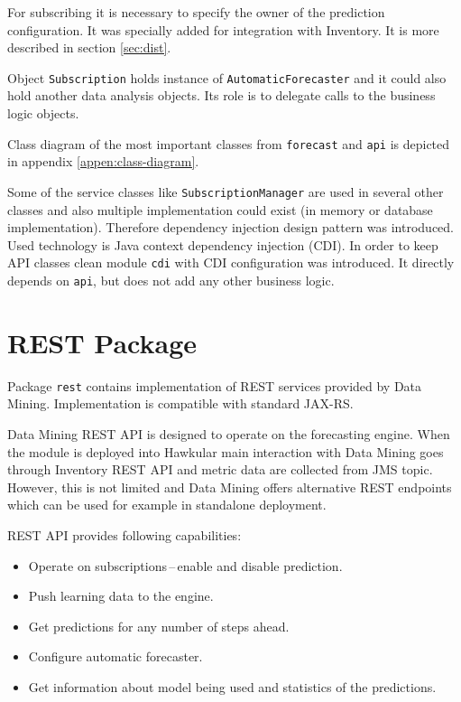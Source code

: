     For subscribing it is necessary to specify the owner of the prediction configuration. It was specially added for
    integration with Inventory. It is more described in section \ref{sec:dist}.

    Object \texttt{Subscription} holds instance of \texttt{AutomaticForecaster} and it could also hold another
    data analysis objects. Its role is to delegate calls to the business logic objects.

    Class diagram of the most important classes from \texttt{forecast} and \texttt{api} is depicted in appendix
    \ref{appen:class-diagram}.

    Some of the service classes like \texttt{SubscriptionManager} are used in several other classes and also multiple
    implementation could exist (in memory or database implementation). Therefore dependency injection
    design pattern was introduced. Used technology is Java context dependency injection (CDI). In order to keep
    API classes clean module \texttt{cdi} with CDI configuration was introduced. It directly depends on \texttt{api},
    but does not add any other business logic.

    \section{REST Package}
    Package \texttt{rest} contains implementation of REST services provided by Data Mining. Implementation is
    compatible with standard JAX-RS.

    Data Mining REST API is designed to operate on the forecasting engine. When the module is deployed into Hawkular
    main interaction with Data Mining goes through Inventory REST API and metric data are collected from JMS topic.
    However, this is not limited and Data Mining offers alternative REST endpoints which can be used for
    example in standalone deployment.

    REST API provides following capabilities:

    \begin{itemize}
        \item Operate on subscriptions\,--\,enable and disable prediction.
        \item Push learning data to the engine.
        \item Get predictions for any number of steps ahead.
        \item Configure automatic forecaster.
        \item Get information about model being used and statistics of the predictions.
    \end{itemize}

